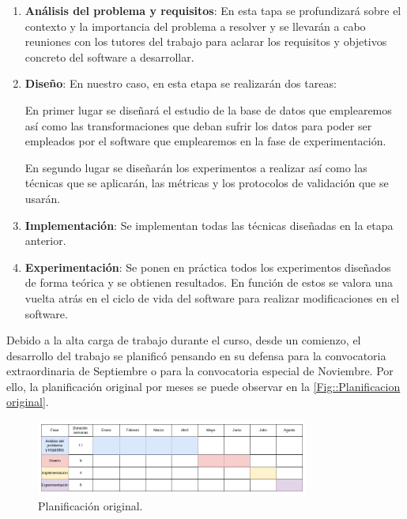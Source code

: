     \begin{enumerate}
        \item \textbf{Análisis del problema y requisitos}: En esta tapa se profundizará sobre el contexto y la importancia del problema a resolver y se llevarán a cabo reuniones con los tutores del trabajo para aclarar los requisitos y objetivos concreto del software a desarrollar. 
        \item \textbf{Diseño}: En nuestro caso, en esta etapa se realizarán dos tareas: 
        
        En primer lugar se diseñará el estudio de la base de datos que emplearemos así como las transformaciones que deban sufrir los datos para poder ser empleados por el software que emplearemos en la fase de experimentación. 

        En segundo lugar se diseñarán los experimentos a realizar así como las técnicas que se aplicarán, las métricas y los protocolos de validación que se usarán.

        \item \textbf{Implementación}: Se implementan todas las técnicas diseñadas en la etapa anterior.
        \item \textbf{Experimentación}: Se ponen en práctica todos los experimentos diseñados de forma teórica y se obtienen resultados. En función de estos se valora una vuelta atrás en el ciclo de vida del software para realizar modificaciones en el software.
    \end{enumerate}
    
    \medskip

    \noindent Debido a la alta carga de trabajo durante el curso, desde un comienzo, el desarrollo del trabajo se planificó pensando en su defensa para la convocatoria extraordinaria de Septiembre o para la convocatoria especial de Noviembre. Por ello, la planificación original por meses se puede observar en la \autoref{Fig::Planificacion original}.


    \begin{figure}[!h]
        \centering
        \includegraphics[width=0.8\textwidth]{img/plan_provisional.png}
        \caption{Planificación original.}
        \label{Fig::Planificacion original}
    \end{figure}

